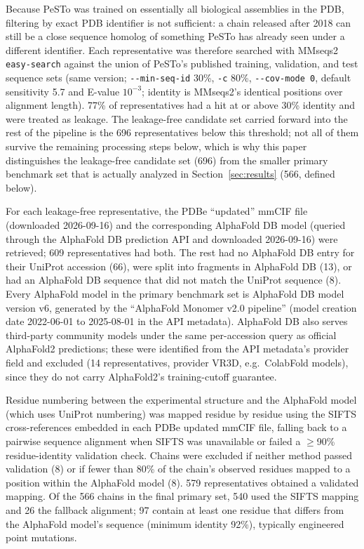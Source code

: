 \documentclass[10pt]{article}
\begin{document}
Because PeSTo was trained on essentially all biological assemblies in the PDB,
filtering by exact PDB identifier is not sufficient: a chain released after
2018 can still be a close sequence homolog of something PeSTo has already seen
under a different identifier. Each representative was therefore searched with
MMseqs2 \texttt{easy-search} against the union of PeSTo's published training,
validation, and test sequence sets (same version; \texttt{-{}-min-seq-id}
30\%, \texttt{-c} 80\%,
\texttt{-{}-cov-mode 0}, default sensitivity 5.7 and E-value $10^{-3}$;
identity is MMseqs2's identical positions over alignment length).
77\% of representatives had a hit at or above
30\% identity and were treated as leakage. The
leakage-free candidate set carried forward into the rest of the pipeline is
the 696 representatives below this threshold; not all of them
survive the remaining processing steps below, which is why this paper
distinguishes the leakage-free candidate set (696) from the
smaller primary benchmark set that is actually analyzed in
Section~\ref{sec:results} (566, defined below).

For each leakage-free representative, the PDBe ``updated'' mmCIF file
(downloaded 2026-09-16) and the corresponding AlphaFold DB model
(queried through the AlphaFold DB prediction API and downloaded
2026-09-16) were retrieved; 609 representatives had
both. The rest had no AlphaFold DB entry for their UniProt accession
(66), were split into fragments in AlphaFold DB
(13), or had an AlphaFold DB sequence that did not match
the UniProt sequence (8). Every AlphaFold model in the
primary benchmark set is AlphaFold DB model version v6,
generated by the ``AlphaFold Monomer v2.0 pipeline'' (model creation date
2022-06-01 to 2025-08-01 in the API metadata). AlphaFold DB also serves
third-party community models under the same per-accession query as official
AlphaFold2 predictions; these were identified from the API metadata's
provider field and excluded (14 representatives, provider
VR3D, e.g.\ ColabFold models), since they do not carry
AlphaFold2's training-cutoff guarantee.

Residue numbering between the experimental structure and the AlphaFold model
(which uses UniProt numbering) was mapped residue by residue using the SIFTS
cross-references embedded in each PDBe updated mmCIF file, falling back to a
pairwise sequence alignment when SIFTS was unavailable or failed a
$\geq$90\% residue-identity validation check.
Chains were excluded if neither method passed validation
(8) or if fewer than 80\% of the
chain's observed residues mapped to a position within the AlphaFold model
(8). 579 representatives obtained a validated
mapping. Of the 566 chains in the final primary set,
540 used the SIFTS mapping and 26 the
fallback alignment; 97 contain at least one residue that
differs from the AlphaFold model's sequence (minimum identity
92\%), typically engineered point mutations.
\end{document}
